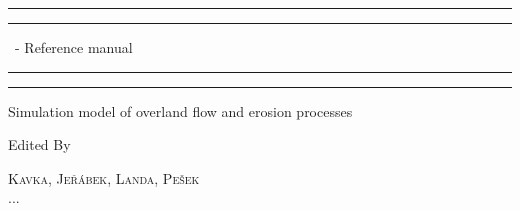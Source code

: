 

\begin{titlepage} %

	\centering %
	
	\scshape %
	
	\vspace*{\baselineskip} %
	
	
	\rule{\textwidth}{0pt}\vspace*{-\baselineskip}\vspace*{2pt} %
	\rule{\textwidth}{0.4pt} %
	
	\vspace{0.75\baselineskip} %
	
	{\LARGE \smod\ - Reference manual} %
	
	\vspace{0.75\baselineskip} %
	
	\rule{\textwidth}{0.4pt}\vspace*{-\baselineskip}\vspace{3.2pt} %
	\rule{\textwidth}{0pt} %
	
	\vspace{2\baselineskip} %
	
	
	Simulation model of overland flow and erosion processes
	
	\vspace*{3\baselineskip} %
	
	
	Edited By
	
	\vspace{0.5\baselineskip} %
	
	{\scshape\Large Kavka, Jeřábek, Landa, Pešek \\ ... \\} %
	

\end{titlepage}
